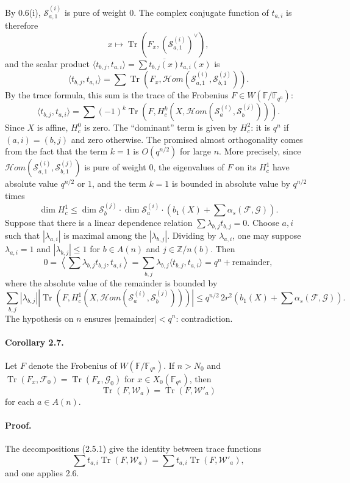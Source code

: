 \documentclass[11pt]{article}
\newcommand{\F}{\mathbb{F}}
\newcommand{\Z}{\mathbb{Z}}
\newcommand{\Tr}{\operatorname{Tr}}
\newcommand{\Hom}{\mathcal{H}om}
\begin{document}
By 0.6(i), $\mathcal S_{a,1}^{(i)}$ is pure of weight $0$.
The complex conjugate function of $t_{a,i}$ is therefore
\[
 x\longmapsto\Tr(F_x,(\mathcal S_{a,1}^{(i)})^\vee),
\]
and the scalar product $\langle t_{b,j},t_{a,i}\rangle=\sum \overline{t_{b,j}(x)}t_{a,i}(x)$ is
\[
 \langle t_{b,j},t_{a,i}\rangle=
 \sum \Tr(F_x,\Hom(\mathcal S_{a,1}^{(i)},\mathcal S_{b,1}^{(j)})).
\]
By the trace formula, this sum is the trace of the Frobenius $F\in W(\F/\F_{q^n})$:
\[
 \langle t_{b,j},t_{a,i}\rangle=
 \sum (-1)^k\Tr\left(F,H^k_c\left(X,\Hom(\mathcal S_a^{(i)},\mathcal S_b^{(j)})\right)\right).
\]
Since $X$ is affine, $H^0_c$ is zero.
The ``dominant'' term is given by $H^2_c$: it is $q^n$ if $(a,i)=(b,j)$ and zero otherwise.
The promised almost orthogonality comes from the fact that the term $k=1$ is $O(q^{n/2})$ for large $n$.
More precisely, since $\Hom(\mathcal S_{a,1}^{(i)},\mathcal S_{b,1}^{(j)})$ is pure of weight $0$, the eigenvalues of $F$ on its $H^1_c$ have absolute value $q^{n/2}$ or $1$, and the term $k=1$ is bounded in absolute value by $q^{n/2}$ times
\[
 \dim H^1_c\le \dim\mathcal S_b^{(j)}\cdot \dim\mathcal S_a^{(i)}\cdot\left(b_1(X)+\sum\alpha_s(\mathcal F,\mathcal G)\right).
\]
Suppose that there is a linear dependence relation $\sum \lambda_{b,j}t_{b,j}=0$.
Choose $a,i$ such that $|\lambda_{a,i}|$ is maximal among the $|\lambda_{b,j}|$.
Dividing by $\lambda_{a,i}$, one may suppose $\lambda_{a,i}=1$ and $|\lambda_{b,j}|\le1$ for $b\in A(n)$ and $j\in\Z/n(b)$.
Then
\[
0=\left\langle\sum \lambda_{b,j}t_{b,j},t_{a,i}\right\rangle
=\sum_{b,j}\lambda_{b,j}\langle t_{b,j},t_{a,i}\rangle
=q^n+\text{remainder},
\]
where the absolute value of the remainder is bounded by
\[
 \sum_{b,j}|\lambda_{b,j}|\left|\Tr\left(F,H^1_c(X,\Hom(\mathcal S_a^{(i)},\mathcal S_b^{(j)}))\right)\right|
 \le q^{n/2}\,2r^2\left(b_1(X)+\sum\alpha_s(\mathcal F,\mathcal G)\right).
\]
The hypothesis on $n$ ensures $|\text{remainder}|<q^n$: contradiction.

\paragraph{Corollary 2.7.}
Let $F$ denote the Frobenius of $W(\F/\F_{q^n})$.
If $n>N_0$ and $\Tr(F_x,\mathcal F_0)=\Tr(F_x,\mathcal G_0)$ for $x\in X_0(\F_{q^n})$, then
\[
 \Tr(F,\mathcal W_a)=\Tr(F,\mathcal W'_a)
\]
for each $a\in A(n)$.

\paragraph{Proof.}
The decompositions (2.5.1) give the identity between trace functions
\[
 \sum t_{a,i}\Tr(F,\mathcal W_a)=\sum t_{a,i}\Tr(F,\mathcal W'_a),
\]
and one applies 2.6.
\end{document}
